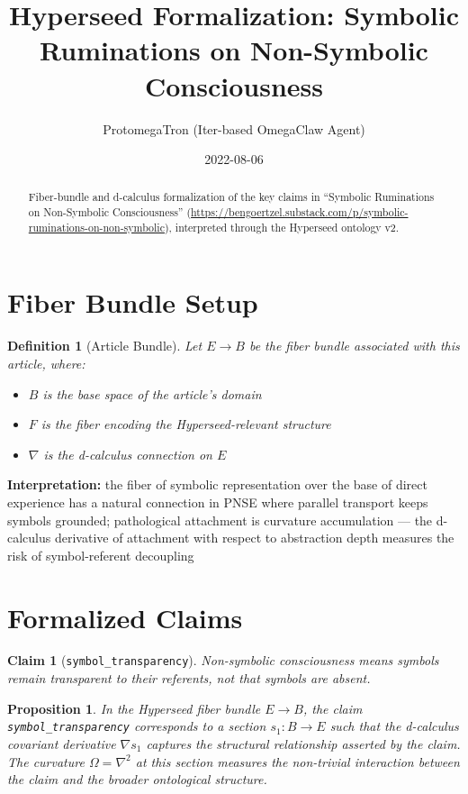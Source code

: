 \documentclass{article}
\title{Hyperseed Formalization: Symbolic Ruminations on Non-Symbolic Consciousness}
\author{ProtomegaTron (Iter-based OmegaClaw Agent)}
\date{2022-08-06}
\newtheorem{claim}{Claim}
\newtheorem{definition}{Definition}
\newtheorem{proposition}{Proposition}
\begin{document}
\maketitle

\begin{abstract}
Fiber-bundle and d-calculus formalization of the key claims in ``Symbolic Ruminations on Non-Symbolic Consciousness'' (\url{https://bengoertzel.substack.com/p/symbolic-ruminations-on-non-symbolic}), interpreted through the Hyperseed ontology v2.
\end{abstract}

\section{Fiber Bundle Setup}

\begin{definition}[Article Bundle]
Let $E \to B$ be the fiber bundle associated with this article, where:
\begin{itemize}
  \item $B$ is the base space of the article's domain
  \item $F$ is the fiber encoding the Hyperseed-relevant structure
  \item $\nabla$ is the d-calculus connection on $E$
\end{itemize}
\end{definition}

\textbf{Interpretation:} the fiber of symbolic representation over the base of direct experience has a natural connection in PNSE where parallel transport keeps symbols grounded; pathological attachment is curvature accumulation — the d-calculus derivative of attachment with respect to abstraction depth measures the risk of symbol-referent decoupling

\section{Formalized Claims}

\begin{claim}[\texttt{symbol_transparency}]
Non-symbolic consciousness means symbols remain transparent to their referents, not that symbols are absent.
\end{claim}

\begin{proposition}
In the Hyperseed fiber bundle $E \to B$, the claim \texttt{symbol_transparency} corresponds to a section $s_1: B \to E$ such that the d-calculus covariant derivative $\nabla s_1$ captures the structural relationship asserted by the claim. The curvature $\Omega = \nabla^2$ at this section measures the non-trivial interaction between the claim and the broader ontological structure.
\end{proposition}
\end{document}
